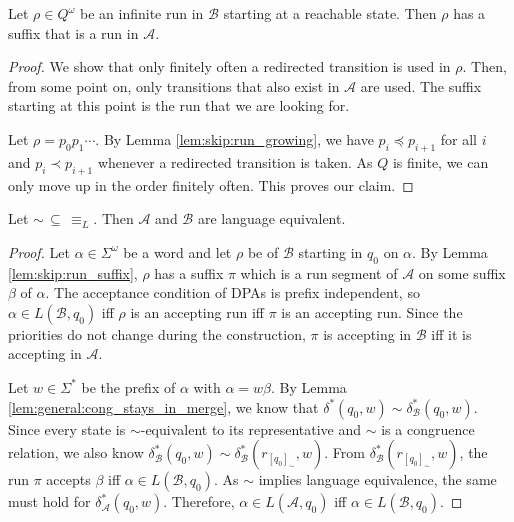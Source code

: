 \begin{lem}
\label{lem:skip:run_suffix}
	Let $\rho \in Q^\omega$ be an infinite run in $\mathcal{B}$ starting at a reachable state. Then $\rho$ has a suffix that is a run in $\mathcal{A}$.
\end{lem} 

\begin{proof}
	We show that only finitely often a redirected transition is used in $\rho$. Then, from some point on, only transitions that also exist in $\mathcal{A}$ are used. The suffix starting at this point is the run that we are looking for.
	
	Let $\rho = p_0 p_1 \cdots$. By Lemma \ref{lem:skip:run_growing}, we have $p_i \preceq p_{i+1}$ for all $i$ and $p_i \prec p_{i+1}$ whenever a redirected transition is taken. As $Q$ is finite, we can only move up in the order finitely often. This proves our claim.
\end{proof}


\begin{theorem}
	Let $\sim \,\subseteq\, \equiv_L$. Then $\mathcal{A}$ and $\mathcal{B}$ are language equivalent.
\end{theorem}

\begin{proof}
	Let $\alpha \in \Sigma^\omega$ be a word and let $\rho$ be of $\mathcal{B}$ starting in $q_0$ on $\alpha$. By Lemma \ref{lem:skip:run_suffix}, $\rho$ has a suffix $\pi$ which is a run segment of $\mathcal{A}$ on some suffix $\beta$ of $\alpha$. The acceptance condition of DPAs is prefix independent, so $\alpha \in L(\mathcal{B}, q_0)$ iff $\rho$ is an accepting run iff $\pi$ is an accepting run. Since the priorities do not change during the construction, $\pi$ is accepting in $\mathcal{B}$ iff it is accepting in $\mathcal{A}$.
	
	Let $w \in \Sigma^*$ be the prefix of $\alpha$ with $\alpha = w \beta$. By Lemma \ref{lem:general:cong_stays_in_merge}, we know that $\delta^*(q_0, w) \sim \delta^*_\mathcal{B}(q_0, w)$. Since every state is $\sim$-equivalent to its representative and $\sim$ is a congruence relation, we also know $\delta^*_\mathcal{B}(q_0, w) \sim \delta^*_\mathcal{B}(r_{[q_0]_\sim}, w)$. From $\delta^*_\mathcal{B}(r_{[q_0]_\sim}, w)$, the run $\pi$ accepts $\beta$ iff $\alpha \in L(\mathcal{B}, q_0)$. As $\sim$ implies language equivalence, the same must hold for $\delta^*_\mathcal{A}(q_0, w)$. Therefore, $\alpha \in L(\mathcal{A}, q_0)$ iff $\alpha \in L(\mathcal{B}, q_0)$.
\end{proof}


